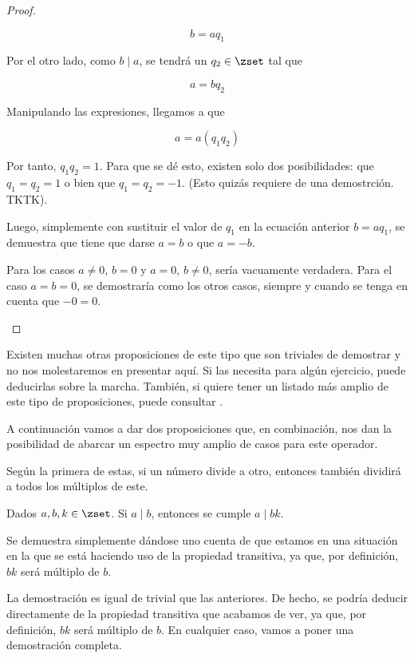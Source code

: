 \begin{proof}
\begin{enumerate}
      $$ b = a q_1 $$

      Por el otro lado, como $b \mid a$, se tendrá un $q_2 \in \zset$ tal
      que

      $$ a = b q_2 $$

      Manipulando las expresiones, llegamos a que

      $$ a = a(q_1 q_2) $$

      Por tanto, $q_1 q_2 = 1$. Para que se dé esto, existen solo dos
      posibilidades: que $q_1 = q_2 = 1$ o bien que $q_1 = q_2 = {-1}$.
      (Esto quizás requiere de una demostrción. TKTK).

      Luego, simplemente con sustituir el valor de $q_1$ en la ecuación
      anterior $b = a q_1$, se demuestra que tiene que darse $a = b$ o que
      $a = {-b}$.

      Para los casos $a \neq 0$, $b = 0$ y $a = 0$, $b \neq 0$, sería
      vacuamente verdadera. Para el caso $a = b = 0$, se demostraría como
      los otros casos, siempre y cuando se tenga en cuenta que ${-0} =
      0$.\qedhere
  \end{enumerate}
\end{proof}

Existen muchas otras proposiciones de este tipo que son triviales de
demostrar y no nos molestaremos en presentar aquí. Si las necesita para
algún ejercicio, puede deducirlas sobre la marcha. También, si quiere tener
un listado más amplio de este tipo de proposiciones, puede consultar
\cite{burton}.

A continuación vamos a dar dos proposiciones que, en combinación, nos dan la
posibilidad de abarcar un espectro muy amplio de casos para este operador.

Según la primera de estas, si un número divide a otro, entonces también
dividirá a todos los múltiplos de este.

\begin{proposition}\label{prop-divide-al-multiplo}
  Dados $a, b, k \in \zset$. Si $a \mid b$, entonces se cumple $a \mid bk$.
\end{proposition}

Se demuestra simplemente dándose uno cuenta de que estamos en una situación
en la que se está haciendo uso de la propiedad transitiva, ya que, por
definición, $bk$ será múltiplo de $b$.

  \iffalse
  La demostración es igual de trivial que las anteriores. De hecho, se
  podría deducir directamente de la propiedad transitiva que acabamos de
  ver, ya que, por definición, $bk$ será múltiplo de $b$. En cualquier caso,
  vamos a poner una demostración completa.

